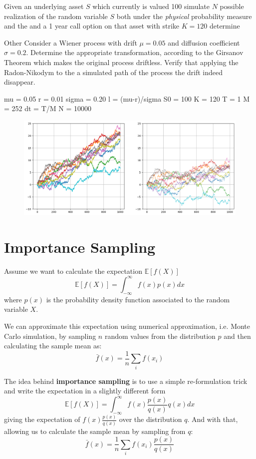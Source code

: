 \documentclass[12pt,a4paper]{article}
\begin{document}
\begin{question}
Given an underlying asset $S$ which currently is valued 100 simulate $N$ possible realization of the random variable $S$ both under the \emph{physical} probability measure and the 
and a 1 year call option on that asset with strike $K=120$ determine 

Other  Consider a Wiener process with drift $\mu=0.05$ and diffusion coefficient $\sigma=0.2$. Determine the appropriate transformation, according to the Girsanov Theorem which makes the original process driftless. Verify that applying the Radon-Nikodym to the a simulated path of the process the drift indeed disappear.

mu = 0.05
r = 0.01
sigma = 0.20
l = (mu-r)/sigma
S0 = 100
K = 120
T = 1
M = 252
dt = T/M
N = 10000
\begin{figure}[htbp]
	\begin{center}
		\includegraphics[width=0.5\linewidth]{addons/brownian_motion_girsanov}
	\end{center}
	\label{fig:brownian_motion_girsanov}
\end{figure}
\end{question}

\clearpage
\section{Importance Sampling}
Assume we want to calculate the expectation $\mathbb{E}[f(X)]$
\begin{equation}
\mathbb{E}[f(X)] = \int_{-\infty}^\infty f(x)p(x)dx
\end{equation}
where $p(x)$ is the probability density function associated to the random variable $X$.

We can approximate this expectation using numerical approximation, i.e. Monte Carlo simulation, by sampling $n$ random values from the distribution $p$ and then calculating the sample mean as:
\begin{equation}
\bar{f}(x) = \frac{1}{n}\sum_i f(x_i)
\end{equation}

The idea behind \textbf{importance sampling} is to use a simple re-formulation trick and write the expectation in a slightly different form
\begin{equation}
\mathbb{E}[f(X)] = \int_{-\infty}^\infty f(x)\frac{p(x)}{q(x)}q(x)dx
\end{equation}
giving the expectation of $f(x)\frac{p(x)}{q(x)}$ over the distribution $q$. And with that, allowing us to calculate the sample mean by sampling from $q$:
\begin{equation}
\bar{f}(x) = \frac{1}{n}\sum_i f(x_i)\frac{p(x)}{q(x)}
\label{eq:reformulated_expectation}
\end{equation}
\end{document}
